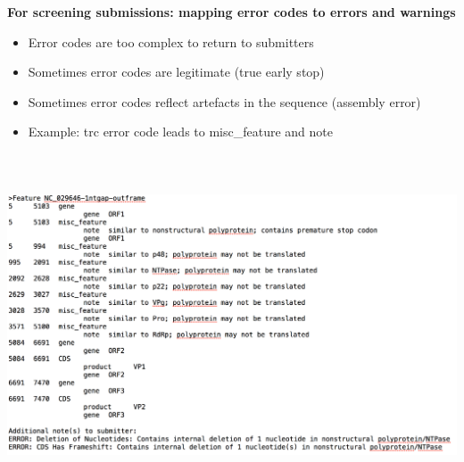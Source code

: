 \documentclass[landscape]{slides}
\begin{document}
\begin{slide}
\begin{center}
\textbf{For screening submissions: mapping error codes to errors and warnings}

\small
\begin{itemize}
\item Error codes are too complex to return to submitters
\item Sometimes error codes are legitimate (true early stop)
\item Sometimes error codes reflect artefacts in the sequence (assembly error)
\item Example: trc error code leads to misc\_feature and note
\end{itemize}

\includegraphics[height=4in]{figs/noro-ftable-example}

\end{center}
\vfill
\end{slide}
\end{document}
